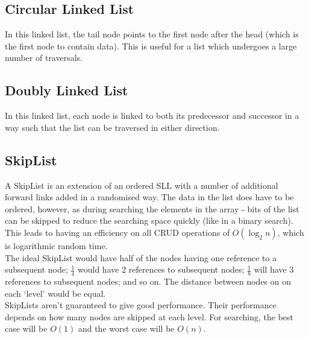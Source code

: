 \subsection{Circular Linked List}
In this linked list, the tail node points to the first node after the head (which is the first node to contain data). This is useful for a list which undergoes a large number of traversals.

\subsection{Doubly Linked List}
In this linked list, each node is linked to both its predecessor and successor in a way such that the list can be traversed in either direction.

\subsection{SkipList}
A SkipList is an extension of an ordered SLL with a number of additional forward links added in a randomised way. The data in the list does have to be ordered, however, as during searching the elements in the array - bits of the list can be skipped to reduce the searching space quickly (like in a binary search). This leads to having an efficiency on all CRUD operations of $O(\log_2n)$, which is logarithmic random time.\\

The ideal SkipList would have half of the nodes having one reference to a subsequent node; $\frac{1}{4}$ would have 2 references to subsequent nodes; $\frac{1}{8}$ will have 3 references to subsequent nodes; and so on. The distance between nodes on on each `level' would be equal. \\

SkipLists aren't guaranteed to give good performance. Their performance depends on how many nodes are skipped at each level. For searching, the best case will be $O(1)$ and the worst case will be $O(n)$. 